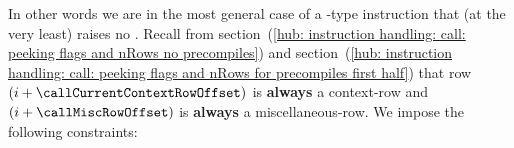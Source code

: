 \begin{center}
\end{center}
In other words we are in the most general case of a -type instruction that (at the very least) raises no \suxSH{}. 
Recall from
section~(\ref{hub: instruction handling: call: peeking flags and nRows no precompiles}) and
section~(\ref{hub: instruction handling: call: peeking flags and nRows for precompiles first half})
that row
$(i + \callCurrentContextRowOffset)$ is \textbf{always} a context-row and
$(i + \callMiscRowOffset)$ is \textbf{always} a miscellaneous-row.
We impose the following constraints:
